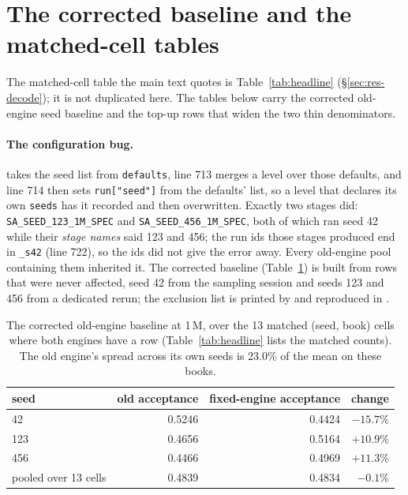\documentclass{article}
\begin{document}
\section{The corrected baseline and the matched-cell tables}
\label{app:baseline}

The matched-cell table the main text quotes is Table~\ref{tab:headline}
(\S\ref{sec:res-decode}); it is not duplicated here. The tables below carry the corrected old-engine seed baseline and the top-up rows that widen the two thin denominators.

\paragraph{The configuration bug.}  takes the seed list from
\texttt{defaults}, line 713 merges a level over those defaults, and line 714 then sets
\texttt{run["seed"]} from the defaults' list, so a level that declares its own \texttt{seeds}
has it recorded and then overwritten. Exactly two stages did:
\texttt{SA\_SEED\_123\_1M\_SPEC} and \texttt{SA\_SEED\_456\_1M\_SPEC}, both of which ran seed
42 while their \emph{stage names} said 123 and 456; the run ids those stages produced end in
\texttt{\_s42} (line 722), so the ids did not give the error away. Every old-engine pool
containing them inherited it. The corrected baseline (Table~\ref{tab:seedbias}) is built from rows that were never affected, seed 42 from the sampling session and seeds 123 and 456 from a dedicated rerun; the
exclusion list is printed by  and reproduced in
.

\begin{table}[h]
\centering\footnotesize
\caption{The corrected old-engine baseline at 1\,M, over the 13 matched (seed, book) cells
where both engines have a row (Table~\ref{tab:headline} lists the matched counts). The old
engine's spread across its own seeds is 23.0\% of the mean on these books.}
\label{tab:seedbias}
\begin{tabular}{lrrr}
\toprule
seed & old acceptance & fixed-engine acceptance & change \\
\midrule
42  & 0.5246 & 0.4424 & $-15.7\%$ \\
123 & 0.4656 & 0.5164 & $+10.9\%$ \\
456 & 0.4466 & 0.4969 & $+11.3\%$ \\
\midrule
pooled over 13 cells & 0.4839 & 0.4834 & $-0.1\%$ \\
\bottomrule
\end{tabular}
\end{table}
\end{document}
